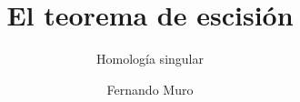 \documentclass[aspectratio=169,11pt]{beamer}
\title{El teorema de escisión}
\subtitle{Homología singular}
\author{Fernando Muro}
\institute{Universidad de Sevilla}
\date{}
\begin{document}
\begin{frame}
  \titlepage
\end{frame}











\end{document}
